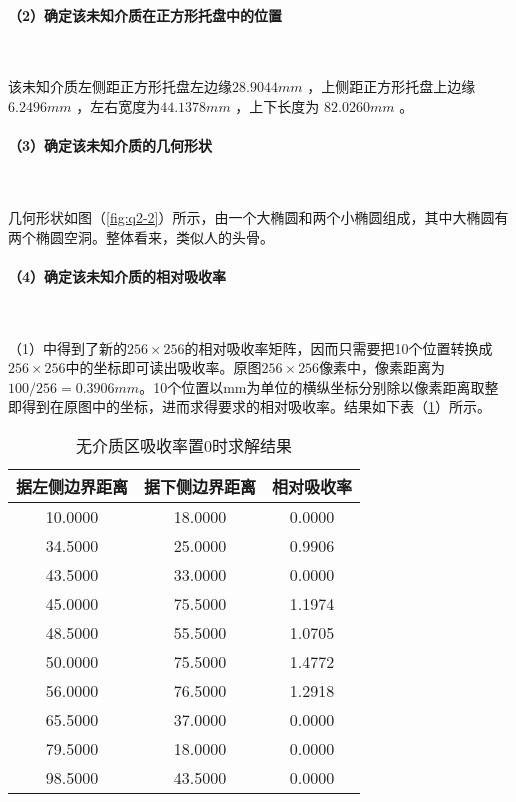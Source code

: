 \documentclass[withoutpreface,bwprint]{cumcmthesis} %
\begin{document}
\paragraph*{（2）确定该未知介质在正方形托盘中的位置}~\\

\par 该未知介质左侧距正方形托盘左边缘$28.9044mm$  ，上侧距正方形托盘上边缘$6.2496mm$   ，左右宽度为$44.1378mm$    ，上下长度为 $82.0260mm$ 。
\paragraph*{（3）确定该未知介质的几何形状}~\\
\par 几何形状如图（\ref{fig:q2-2}）所示，由一个大椭圆和两个小椭圆组成，其中大椭圆有两个椭圆空洞。整体看来，类似人的头骨。
\newpage
\paragraph*{（4）确定该未知介质的相对吸收率}~\\
\par（1）中得到了新的$256\times 256$的相对吸收率矩阵，因而只需要把10个位置转换成$256\times 256$中的坐标即可读出吸收率。原图$256\times 256$像素中，像素距离为$100/256=0.3906mm$。10个位置以mm为单位的横纵坐标分别除以像素距离取整即得到在原图中的坐标，进而求得要求的相对吸收率。结果如下表（\ref{q2无介质区吸收率置0时求解结果}）所示。

\begin{table}[!h]
\centering
\renewcommand\arraystretch{0.6}
\caption{无介质区吸收率置0时求解结果}
\label{q2无介质区吸收率置0时求解结果}
\begin{tabular}{ccc}
\toprule
据左侧边界距离&据下侧边界距离&相对吸收率\\
\midrule
10.0000 &	18.0000 &0.0000\\
34.5000 &	25.0000 &0.9906\\
43.5000 &	33.0000 &0.0000\\
45.0000 &	75.5000 &1.1974\\
48.5000 &	55.5000 &1.0705\\
50.0000 &	75.5000 &1.4772\\
56.0000 &	76.5000 &1.2918\\
65.5000 &	37.0000 &0.0000\\
79.5000 &	18.0000 &0.0000\\
98.5000 &	43.5000 &0.0000\\
\bottomrule 
\end{tabular}
\end{table}
\end{document}
